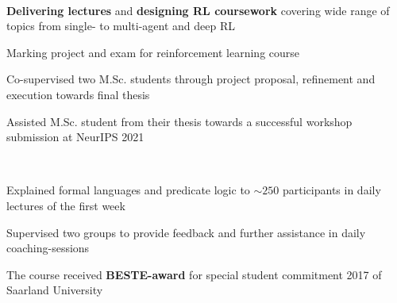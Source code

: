 \documentclass[]{lukas-cv-openfont}
\begin{document}

\noindent
{}
\\
\begin{tightitemize}{1.7em}
    \item \textbf{Delivering lectures} and \textbf{designing RL coursework} covering wide range of topics from single- to multi-agent and deep RL
    \item Marking project and exam for reinforcement learning course
\end{tightitemize}
\largesectionsep

\begin{tightitemize}{1.7em}
    \item Co-supervised two M.Sc. students through project proposal, refinement and execution towards final thesis
    \item Assisted M.Sc. student from their thesis towards a successful workshop submission at NeurIPS 2021
\end{tightitemize}
\largesectionsep

\noindent
{}
\\
\begin{tightitemize}{1.7em}
    \item Explained formal languages and predicate logic to $\sim250$ participants in daily lectures of the first week
    \item Supervised two groups to provide feedback and further assistance in daily coaching-sessions
    \item The course received \textbf{BESTE-award} for special student commitment 2017 of Saarland University
\end{tightitemize}
\largesectionsep
\end{document}
